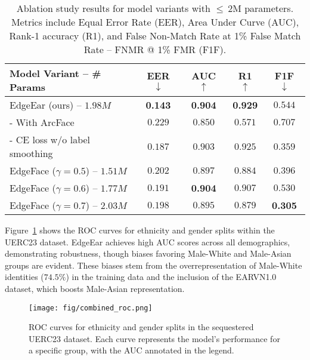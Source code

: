 \documentclass[a4paper, 10pt, conference]{ieeeconf}
\begin{document}
\begin{table}[ht]
\centering
\caption{Ablation study results for model variants with $\leq\,2$M parameters. Metrics include Equal Error Rate (EER), Area Under Curve (AUC), Rank-1 accuracy (R1), and False Non-Match Rate at 1\% False Match Rate – FNMR @ 1\% FMR (F1F).}
\label{tab:ablation-results}
\begin{tabular}{@{}lcccc@{}}
\toprule
\textbf{Model Variant -- \# Params}                   & \textbf{EER} $\downarrow$ & \textbf{AUC} $\uparrow$ & \textbf{R1} $\uparrow$ & \textbf{F1F} $\downarrow$ \\ \midrule
EdgeEar (ours) -- $1.98M$                          & \textbf{0.143}             & \textbf{0.904}             & \textbf{0.929}            & $0.544$             \\
\quad - With ArcFace                     & $0.229$             & $0.850$             & $0.571$            & $0.707$             \\
\quad - CE loss w/o label smoothing      & $0.187$             & $0.903$             & $0.925$            & $0.359$             \\
EdgeFace ($\gamma = 0.5$) -- $1.51M$                & $0.202$             & $0.897$             & $0.884$            & $0.396$                 \\
EdgeFace ($\gamma = 0.6$) -- $1.77M$                & $0.191$             & \textbf{0.904}              & $0.907$            & $0.530$                 \\
EdgeFace ($\gamma = 0.7$) -- $2.03M$               & $0.198$              & $0.895$            & $0.879$         & \textbf{0.305}                 \\ 
\bottomrule
\end{tabular}
\end{table}

Figure~\ref{fig:combined_roc} shows the ROC curves for ethnicity and gender splits within the UERC23 dataset. EdgeEar achieves high AUC scores across all demographics, demonstrating robustness, though biases favoring Male-White and Male-Asian groups are evident. These biases stem from the overrepresentation of Male-White identities ($74.5\%$) in the training data and the inclusion of the EARVN1.0 dataset, which boosts Male-Asian representation.


\begin{figure}[ht!]
    \centering
    \texttt{[image: fig/combined\_roc.png]}
    \caption{ROC curves for ethnicity and gender splits in the sequestered UERC23 dataset. Each curve represents the model's performance for a specific group, with the AUC annotated in the legend.}
    \label{fig:combined_roc}
\end{figure}
\end{document}
